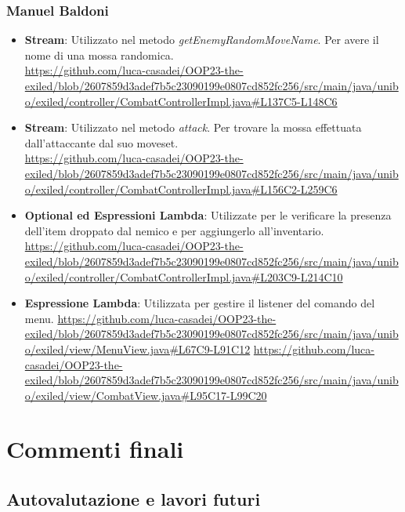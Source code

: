 \documentclass[a4paper,12pt]{report}
\begin{document}
\subsection{Manuel Baldoni}
\begin{itemize}
	\item \textbf{Stream}: Utilizzato nel metodo \textit{getEnemyRandomMoveName}. Per avere il nome di una mossa randomica.\\ \url{https://github.com/luca-casadei/OOP23-the-exiled/blob/2607859d3adef7b5c23090199e0807cd852fc256/src/main/java/unibo/exiled/controller/CombatControllerImpl.java#L137C5-L148C6}
	\item \textbf{Stream}: Utilizzato nel metodo \textit{attack}. Per trovare la mossa effettuata dall'attaccante dal suo moveset.\\ \url{https://github.com/luca-casadei/OOP23-the-exiled/blob/2607859d3adef7b5c23090199e0807cd852fc256/src/main/java/unibo/exiled/controller/CombatControllerImpl.java#L156C2-L259C6}
	\item \textbf{Optional ed Espressioni Lambda}: Utilizzate per le verificare la presenza dell'item droppato dal nemico e per aggiungerlo all'inventario.
	\url{https://github.com/luca-casadei/OOP23-the-exiled/blob/2607859d3adef7b5c23090199e0807cd852fc256/src/main/java/unibo/exiled/controller/CombatControllerImpl.java#L203C9-L214C10}
	\item \textbf{Espressione Lambda}: Utilizzata per gestire il listener del comando del menu.
	\url{https://github.com/luca-casadei/OOP23-the-exiled/blob/2607859d3adef7b5c23090199e0807cd852fc256/src/main/java/unibo/exiled/view/MenuView.java#L67C9-L91C12}
	\url{https://github.com/luca-casadei/OOP23-the-exiled/blob/2607859d3adef7b5c23090199e0807cd852fc256/src/main/java/unibo/exiled/view/CombatView.java#L95C17-L99C20}
\end{itemize}

\chapter{Commenti finali}

\section{Autovalutazione e lavori futuri}
\end{document}
